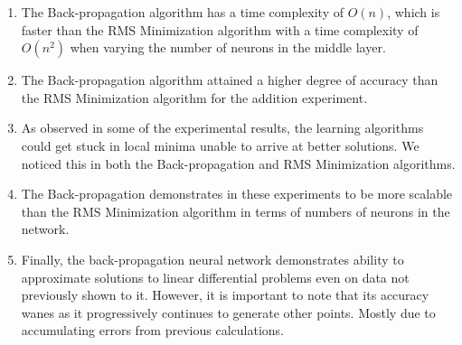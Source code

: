 \documentclass[11pt]{article}
\begin{document}
\begin{enumerate}

\item The Back-propagation algorithm has a time complexity of $O(n)$, which is faster than the RMS Minimization algorithm with a time
complexity of $O(n^{2})$ when varying the number of neurons in the middle layer.

\item The Back-propagation algorithm attained a higher degree of accuracy than the RMS Minimization algorithm for the addition
experiment.

\item As observed in some of the experimental results, the learning algorithms could get stuck in local minima unable to arrive at
better solutions. We noticed this in both the Back-propagation and RMS Minimization algorithms.

\item The Back-propagation demonstrates in these experiments to be more scalable than the RMS Minimization algorithm in terms of numbers
of neurons in the network.

\item Finally, the back-propagation neural network demonstrates ability to approximate solutions to linear differential problems even on
data not previously shown to it. However, it is important to note that its accuracy wanes as it progressively continues to generate
other points. Mostly due to accumulating errors from previous calculations.

\end{enumerate}



\end{document}
